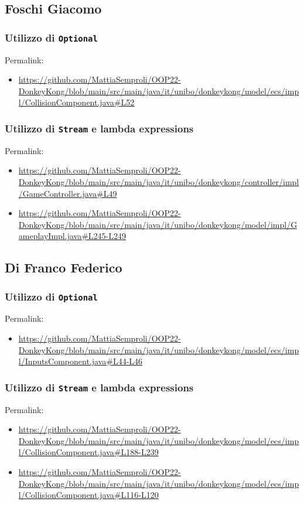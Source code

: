 \documentclass[a4paper,12pt]{report}
\begin{document}
\subsection*{Foschi Giacomo}
\subsubsection{Utilizzo di \texttt{Optional}}
Permalink:
\begin{itemize}
    \item \url{https://github.com/MattiaSemproli/OOP22-DonkeyKong/blob/main/src/main/java/it/unibo/donkeykong/model/ecs/impl/CollisionComponent.java#L52}
\end{itemize}

\subsubsection{Utilizzo di \texttt{Stream} e lambda expressions}
Permalink:
\begin{itemize}
    \item \url{https://github.com/MattiaSemproli/OOP22-DonkeyKong/blob/main/src/main/java/it/unibo/donkeykong/controller/impl/GameController.java#L49}
    \item \url{https://github.com/MattiaSemproli/OOP22-DonkeyKong/blob/main/src/main/java/it/unibo/donkeykong/model/impl/GameplayImpl.java#L245-L249}
\end{itemize}

\subsection*{Di Franco Federico}
\subsubsection{Utilizzo di \texttt{Optional}}
Permalink:
\begin{itemize}
    \item \url{https://github.com/MattiaSemproli/OOP22-DonkeyKong/blob/main/src/main/java/it/unibo/donkeykong/model/ecs/impl/InputsComponent.java#L44-L46}
\end{itemize}

\subsubsection{Utilizzo di \texttt{Stream} e lambda expressions}
Permalink:
\begin{itemize}
    \item \url{https://github.com/MattiaSemproli/OOP22-DonkeyKong/blob/main/src/main/java/it/unibo/donkeykong/model/ecs/impl/CollisionComponent.java#L188-L239}
    \item \url{https://github.com/MattiaSemproli/OOP22-DonkeyKong/blob/main/src/main/java/it/unibo/donkeykong/model/ecs/impl/CollisionComponent.java#L116-L120}
\end{itemize}
\end{document}
